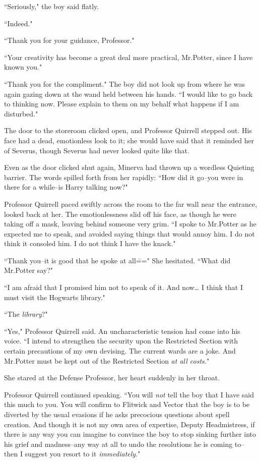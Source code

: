 ``Seriously," the boy said flatly.

``Indeed."

``Thank you for your guidance, Professor."

``Your creativity has become a great deal more practical, Mr.\?Potter, since I have known you."

``Thank you for the compliment." The boy did not look up from where he was again gazing down at the wand held between his hands. ``I would like to go back to thinking now. Please explain to them on my behalf what happens if I am disturbed."

\later

The door to the storeroom clicked open, and Professor Quirrell stepped out. His face had a dead, emotionless look to it; she would have said that it reminded her of Severus, though Severus had never looked quite like that.

Even as the door clicked shut again, Minerva had thrown up a wordless Quieting barrier. The words spilled forth from her rapidly: ``How did it go\---you were in there for a while\---is Harry talking now?"

Professor Quirrell paced swiftly across the room to the far wall near the entrance, looked back at her. The emotionlessness slid off his face, as though he were taking off a mask, leaving behind someone very grim. ``I spoke to Mr.\?Potter as he expected me to speak, and avoided saying things that would annoy him. I do not think it consoled him. I do not think I have the knack."

``Thank you\---it is good that he spoke at all\===" She hesitated. ``What did Mr.\?Potter say?"

``I am afraid that I promised him not to speak of it. And now{\ldots} I think that I must visit the Hogwarts library."

``The \emph{library}?"

``Yes," Professor Quirrell said. An uncharacteristic tension had come into his voice. ``I intend to strengthen the security upon the Restricted Section with certain precautions of my own devising. The current wards are a joke. And Mr.\?Potter must be kept out of the Restricted Section \emph{at all costs.}"

She stared at the Defense Professor, her heart suddenly in her throat.

Professor Quirrell continued speaking. ``You will \emph{not} tell the boy that I have said this much to you. You will confirm to Flitwick and Vector that the boy is to be diverted by the usual evasions if he asks precocious questions about spell creation. And though it is not my own area of expertise, Deputy Headmistress, if there is any way you can imagine to convince the boy to stop sinking further into his grief and madness\---any way at all to undo the resolutions he is coming to\---then I suggest you resort to it \emph{immediately}."

